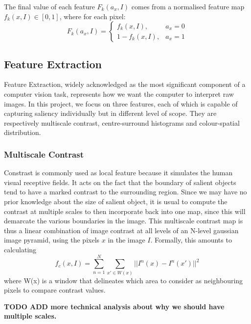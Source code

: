 \documentclass[10pt,twocolumn,letterpaper]{article}
\newcommand{\SUM}{\sum\limits}
\newcommand{\BOLD}{\textbf}
\begin{document}
The final value of each feature $F_k(a_x,I)$ comes from a normalised feature map $f_k(x,I)\in[0,1]$, where for each pixel: $$F_k(a_x,I) = \left\{\begin{matrix}f_k(x,I), & a_x=0\\1-f_k(x,I), & a_x=1\end{matrix}\right.$$


\subsection{Feature Extraction}
Feature Extraction, widely acknowledged as the most significant component of a computer vision task, represents how we want the computer to interpret raw images. In this project, we focus on three features, each of which is capable of capturing saliency individually but in different level of scope. They are respectively multiscale contrast, centre-surround histograms  and colour-spatial distribution. 
\subsubsection{Multiscale Contrast}

Constrast is commonly used as local feature because it simulates the human visual receptive fields. It acts on the fact that the boundary of salient objects tend to have a marked contrast to the surrounding region. Since we may have no prior knowledge about the size of salient object, it is usual to compute the contrast at multiple scales to then incorporate back into one map, since this will demarcate the various boundaries in the image.  This multiscale contrast map is thus a linear combination of image contrast at all levels of an N-level gaussian image pyramid, using the pixels $x$ in the image $I$.  Formally, this amounts to calculating $$f_c(x,I) = \SUM_{n = 1}^{N}\SUM_{x'\in W(x)}||I^n(x)-I^n(x')||^2$$ where W(x) is a window that delineates which area to consider as neighbouring pixels to compare contrast values.

\BOLD{TODO ADD more technical analysis about why we should have multiple scales.}
\end{document}
